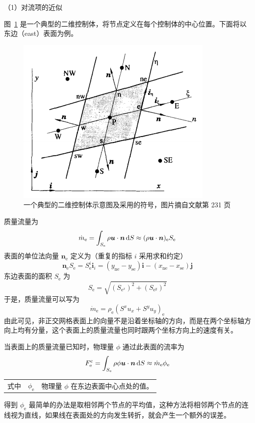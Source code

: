 （1）对流项的近似

图~\ref{fig: CV} 是一个典型的二维控制体，将节点定义在每个控制体的中心位置。下面将以东边（east）表面为例。

\begin{figure}
	\centering
	\includegraphics[scale=.6]{figs/CV}
	\caption{一个典型的二维控制体示意图及采用的符号，图片摘自文献第 231 页}
	\label{fig: CV}
\end{figure}

质量流量为
\begin{equation}
	\dot m_{\mathrm{e}} = \int_{S_{\mathrm{e}}}\rho\bm{u}\cdot\bm{n}\,\mathrm{d} S \approx 
	(\rho\bm{u}\cdot\bm{n})_{\mathrm{e}} S_{\mathrm{e}}
\end{equation}
表面的单位法向量 $\bm{n}_{\mathrm{e}}$ 定义为（重复的指标 $i$ 采用求和约定）
\begin{equation}
	\bm{n}_{\mathrm{e}}S_{\mathrm{e}} = S_{\mathrm{e}}^i \bm{i}_i = 
	(y_{\mathrm{ne}}-y_{\mathrm{se}})\bm{i} - (x_{\mathrm{ne}}-x_{\mathrm{se}})\bm{j}
\end{equation}
东边表面的面积 $S_{\mathrm{e}}$ 为
\begin{equation}
	S_{\mathrm{e}} = \sqrt{(S_{\mathrm{e}^x})^2 + (S_{\mathrm{e}^y})^2}
\end{equation}
于是，质量流量可以写为
\begin{equation}
	\dot m_{\mathrm{e}} = \rho_{\mathrm{e}}(S^x u_x + S^y u_y)_{\mathrm{e}}
\end{equation}
由此可见，非正交网格表面上的向量不是沿着坐标轴的方向，而是在两个坐标轴方向上均有分量，这个表面上的质量流量也同时跟两个坐标方向上的速度有关。

当表面上的质量流量已知时，物理量 $\phi$ 通过此表面的流率为
\begin{equation}
	F_{\mathrm{e}}^{\mathrm{c}} = \int_{S_{\mathrm{e}}}\rho\phi\bm{u}\cdot\bm{n}\,\mathrm{d} S \approx \dot m_{\mathrm{e}} \phi_{\mathrm{e}}
\end{equation}
\begin{tabularx}{\textwidth}{@{}l@{\quad}r@{——}X@{}}
	式中 & $\phi_{\mathrm{e}}$ & 物理量 $\phi$ 在东边表面中心点处的值。
\end{tabularx}\vspace{3.15bp}
得到 $\phi_{\mathrm{e}}$ 最简单的办法是取相邻两个节点的平均值，这种方法将相邻两个节点的连线视为直线，如果线在表面处的方向发生转折，就会产生一个额外的误差。

